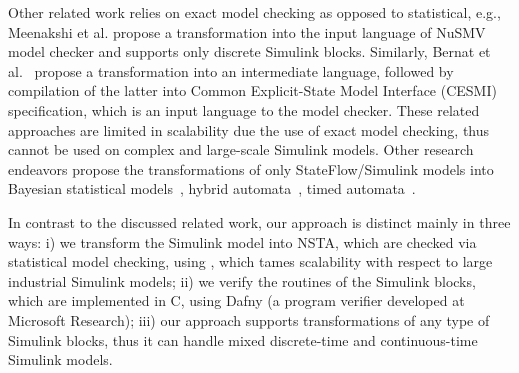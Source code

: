 Other related work relies on exact model checking as opposed to statistical, e.g., Meenakshi et al. \cite{Meenakshi2006ToolChecker} propose a transformation into the input language of NuSMV model checker and supports only discrete Simulink blocks. Similarly, Bernat et al.~\cite{Barnat2012ToolDesigns} propose a transformation into an intermediate language, followed by compilation of the latter into Common Explicit-State Model Interface (CESMI) specification, which is an input language to the \devine{} model checker. These related approaches are limited in scalability due the use of exact model checking, thus cannot be used on complex and large-scale Simulink models. Other research endeavors propose the transformations of only StateFlow/Simulink models into Bayesian statistical models~\cite{Zuliani2010BayesianVerification}, hybrid automata~\cite{ManamcheriSukumar2011TranslationAutomata}, timed automata~\cite{Jiang2016FromDesign}.

In contrast to the discussed related work, our approach is distinct mainly in three ways: i) we transform the Simulink model into NSTA, which are checked via statistical model checking, using \uppaalsmc, which tames scalability with respect to large industrial Simulink models; ii) we verify the routines of the Simulink blocks, which are implemented in C, using Dafny (a program verifier developed at Microsoft Research); iii) our approach supports transformations of any type of Simulink blocks, thus it can handle mixed discrete-time and continuous-time Simulink models. 


